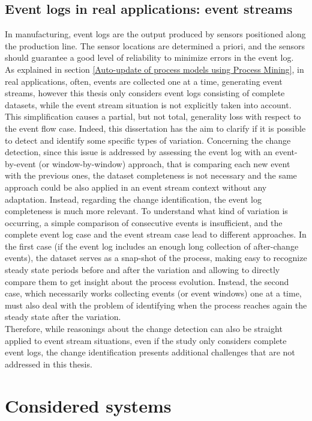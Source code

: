 \subsection{Event logs in real applications: event streams}
In manufacturing, event logs are the output produced by sensors positioned along the production line. The sensor locations are determined a priori, and the sensors should guarantee a good level of reliability to minimize errors in the event log.\\
As explained in section \ref{Auto-update of process models using Process Mining}, in real applications, often, events are collected one at a time, generating event streams, however this thesis only considers event logs consisting of complete datasets, while the event stream situation is not explicitly taken into account. This simplification causes a partial, but not total, generality loss with respect to the event flow case. Indeed, this dissertation has the aim to clarify if it is possible to detect and identify some specific types of variation. Concerning the change detection, since this issue is addressed by assessing the event log with an event-by-event (or window-by-window) approach, that is comparing each new event with the previous ones, the dataset completeness is not necessary and the same approach could be also applied in an event stream context without any adaptation. Instead, regarding the change identification, the event log completeness is much more relevant. To understand what kind of variation is occurring, a simple comparison of consecutive events is insufficient, and the complete event log case and the event stream case lead to different approaches. In the first case (if the event log includes an enough long collection of after-change events), the dataset serves as a snap-shot of the process, making easy to recognize steady state periods before and after the variation and allowing to directly compare them to get insight about the process evolution. Instead, the second case, which necessarily works collecting events (or event windows) one at a time, must also deal with the problem of identifying when the process reaches again the steady state after the variation. \\
Therefore, while reasonings about the change detection can also be straight applied to event stream situations, even if the study only considers complete event logs, the change identification presents additional challenges that are not addressed in this thesis. 
\section{Considered systems}
\label{Considered systems}
